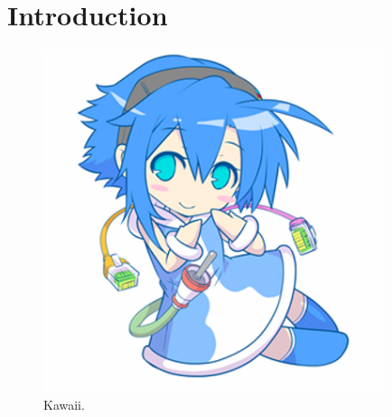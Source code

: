 \chapter{Introduction} \label{sec:introduction}

\begin{figure}[h]
 \vspace{5mm}
 \centering
 \includegraphics[width=100mm]{figures/tech-chan.png}
 \caption{Kawaii.}
 \label{fig:tech-chan}
 \vspace{5mm}
\end{figure}

